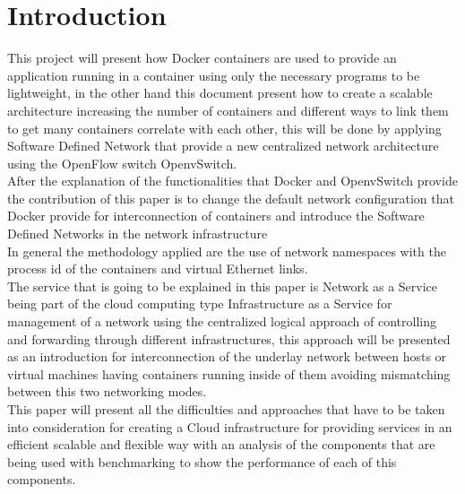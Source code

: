 \chapter{Introduction} %

\label{ch:introduction} %

 
This project will present how Docker containers are used to provide an application running in a container using only the necessary programs to be lightweight, in the other hand this document present how to create a scalable architecture increasing the number of containers and different ways to link them to get many containers correlate with each other, this will be done by applying Software Defined Network that provide a new centralized network architecture using the OpenFlow switch OpenvSwitch.\\

After the explanation of the functionalities that Docker and OpenvSwitch provide the contribution of this paper is to change the default network configuration that Docker provide for interconnection of containers and introduce the Software Defined Networks in the network infrastructure\\
 
In general the methodology applied are the use of network namespaces with the process id of the containers and virtual Ethernet links. \\
 
The service that is going to be explained in this paper is Network as a Service being part of the cloud computing type Infrastructure as a Service for management of a network using the centralized logical approach of controlling and forwarding through different infrastructures, this approach will be presented as an introduction for interconnection of the underlay network between hosts or virtual machines having containers running inside of them avoiding mismatching between this two networking modes. \\
 
This paper will present all the difficulties and approaches that have to be taken into consideration for creating a Cloud infrastructure for providing services in an efficient scalable and flexible way with an analysis of the components that are being used with benchmarking to show the performance of each of this components.\\

